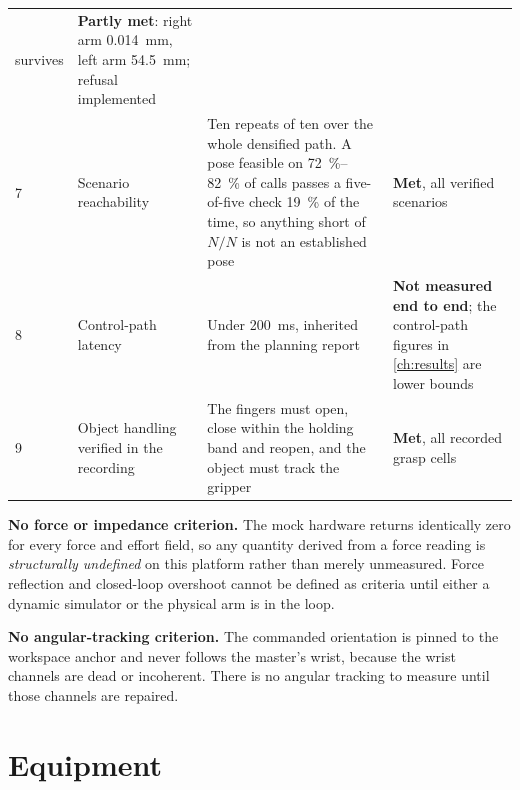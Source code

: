 \begin{table}[H]
\begin{tabular}{@{}p{5mm}p{28mm}p{58mm}p{38mm}@{}}
      survives &
      \textbf{Partly met}: right arm \SI{0.014}{\milli\metre}, left arm
      \SI{54.5}{\milli\metre}; refusal implemented \\
    7 & Scenario reachability &
      Ten repeats of ten over the whole densified path. A pose feasible on
      \SIrange{72}{82}{\percent} of calls passes a five-of-five check
      \SI{19}{\percent} of the time, so anything short of $N/N$ is not an
      established pose &
      \textbf{Met}, all verified scenarios \\
    8 & Control-path latency &
      Under \SI{200}{\milli\second}, inherited from the planning report &
      \textbf{Not measured end to end}; the control-path figures in
      \cref{ch:results} are lower bounds \\
    9 & Object handling verified in the recording &
      The fingers must open, close within the holding band and reopen, and the
      object must track the gripper &
      \textbf{Met}, all recorded grasp cells \\
    \bottomrule
  \end{tabular}
\end{table}

\textbf{No force or impedance criterion.} The mock hardware returns
identically zero for every force and effort field, so any quantity derived
from a force reading is \emph{structurally undefined} on this platform rather
than merely unmeasured. Force reflection and closed-loop overshoot cannot be
defined as criteria until either a dynamic simulator or the physical arm is in
the loop.

\textbf{No angular-tracking criterion.} The commanded orientation is pinned to
the workspace anchor and never follows the master's wrist, because the wrist
channels are dead or incoherent. There is no angular tracking to measure until
those channels are repaired.

\chapter{Equipment}
\label{app:equipment}

